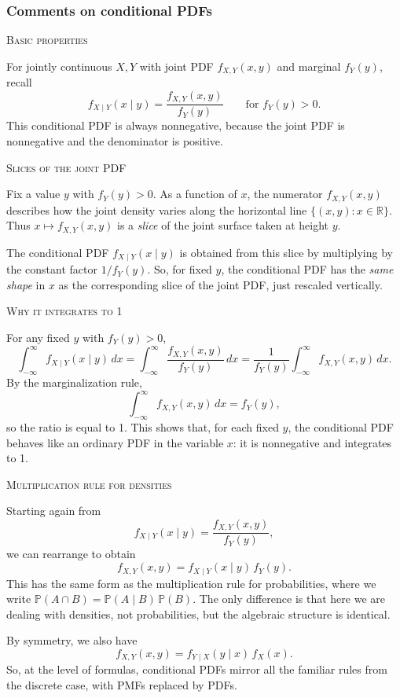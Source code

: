 \subsubsection{Comments on conditional PDFs}

\textsc{Basic properties}

For jointly continuous \(X,Y\) with joint PDF \(f_{X,Y}(x,y)\) and marginal \(f_Y(y)\), recall
\[
f_{X\mid Y}(x\mid y)
=
\frac{f_{X,Y}(x,y)}{f_Y(y)}
\qquad\text{for } f_Y(y)>0.
\]
This conditional PDF is always nonnegative, because the joint PDF is nonnegative and the denominator is positive.

\textsc{Slices of the joint PDF}

Fix a value \(y\) with \(f_Y(y)>0\).  
As a function of \(x\), the numerator \(f_{X,Y}(x,y)\) describes how the joint density varies along the horizontal line \(\{(x,y)\colon x\in\mathbb{R}\}\).  
Thus \(x \mapsto f_{X,Y}(x,y)\) is a \textit{slice} of the joint surface taken at height \(y\).

The conditional PDF \(f_{X\mid Y}(x\mid y)\) is obtained from this slice by multiplying by the constant factor \(1/f_Y(y)\).  
So, for fixed \(y\), the conditional PDF has the \textit{same shape} in \(x\) as the corresponding slice of the joint PDF, just rescaled vertically.

\textsc{Why it integrates to 1}

For any fixed \(y\) with \(f_Y(y)>0\),
\[
\int_{-\infty}^{\infty} f_{X\mid Y}(x\mid y)\,dx
=
\int_{-\infty}^{\infty} \frac{f_{X,Y}(x,y)}{f_Y(y)}\,dx
=
\frac{1}{f_Y(y)}
\int_{-\infty}^{\infty} f_{X,Y}(x,y)\,dx.
\]
By the marginalization rule,
\[
\int_{-\infty}^{\infty} f_{X,Y}(x,y)\,dx
=
f_Y(y),
\]
so the ratio is equal to 1.  
This shows that, for each fixed \(y\), the conditional PDF behaves like an ordinary PDF in the variable \(x\): it is nonnegative and integrates to 1.

\textsc{Multiplication rule for densities}

Starting again from
\[
f_{X\mid Y}(x\mid y)
=
\frac{f_{X,Y}(x,y)}{f_Y(y)},
\]
we can rearrange to obtain
\[
f_{X,Y}(x,y)
=
f_{X\mid Y}(x\mid y)\,f_Y(y).
\]
This has the same form as the multiplication rule for probabilities, where we write
\(\mathbb{P}(A\cap B) = \mathbb{P}(A\mid B)\,\mathbb{P}(B)\).  
The only difference is that here we are dealing with densities, not probabilities, but the algebraic structure is identical.

By symmetry, we also have
\[
f_{X,Y}(x,y)
=
f_{Y\mid X}(y\mid x)\,f_X(x).
\]
So, at the level of formulas, conditional PDFs mirror all the familiar rules from the discrete case, with PMFs replaced by PDFs.



